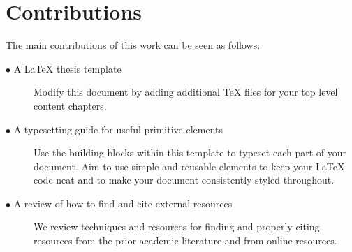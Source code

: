 	\section{Contributions} 
		\label{sec:intro_contribs} 

The main contributions of this work can be seen as follows:

		\begin{description}	

			\item[\(\bullet\) A \LaTeX{} thesis template]\hfill

Modify this document by adding additional \TeX{} files for your top level content chapters. 

			\item[\(\bullet\) A typesetting guide for useful primitive elements]\hfill

Use the building blocks within this template to typeset each part of your document.
Aim to use simple and reusable elements to keep your \LaTeX{} code neat and to make your document consistently styled throughout.

			\item[\(\bullet\) A review of how to find and cite external resources]\hfill

We review techniques and resources for finding and properly citing resources from the prior academic literature and from online resources.

		\end{description}